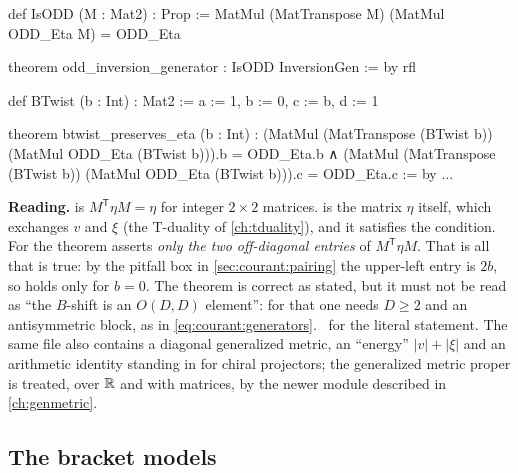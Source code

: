 \begin{leanbox}
\begin{leancode}
def IsODD (M : Mat2) : Prop :=
  MatMul (MatTranspose M) (MatMul ODD_Eta M) = ODD_Eta

theorem odd_inversion_generator : IsODD InversionGen := by
  rfl

def BTwist (b : Int) : Mat2 :=
  { a := 1, b := 0, c := b, d := 1 }

theorem btwist_preserves_eta (b : Int) :
    (MatMul (MatTranspose (BTwist b)) (MatMul ODD_Eta (BTwist b))).b
      = ODD_Eta.b ∧
    (MatMul (MatTranspose (BTwist b)) (MatMul ODD_Eta (BTwist b))).c
      = ODD_Eta.c := by ...
\end{leancode}
\textbf{Reading.}  is $M^{\mathsf T}\eta M=\eta$ for integer $2\times2$ matrices.
 is the matrix $\eta$ itself, which exchanges $v$ and $\xi$ (the T-duality of
\cref{ch:tduality}), and it satisfies the condition. For  the theorem asserts
\emph{only the two off-diagonal entries} of $M^{\mathsf T}\eta M$. That is all that is true: by the
pitfall box in \cref{sec:courant:pairing} the upper-left entry is $2b$, so 
holds only for $b=0$. The theorem is correct as stated, but it must not be read as ``the $B$-shift
is an $O(D,D)$ element'': for that one needs $D\ge2$ and an antisymmetric block, as in
\eqref{eq:courant:generators}. \TA\ for the literal statement. The same file also contains a
diagonal generalized metric, an ``energy'' $|v|+|\xi|$ and an arithmetic identity standing in
for chiral projectors; the generalized metric proper is treated, over $\mathbb{R}$ and with matrices, by
the newer module described in \cref{ch:genmetric}.
\end{leanbox}

\subsection{The bracket models}

